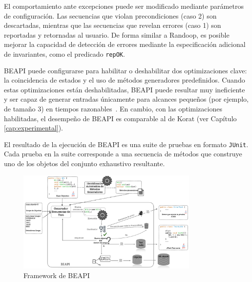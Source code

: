 El comportamiento ante excepciones puede ser modificado mediante parámetros de configuración. 
Las secuencias que violan precondiciones (caso 2) son descartadas, 
mientras que las secuencias que revelan errores (caso 1) 
son reportadas y retornadas al usuario. De forma similar a Randoop, 
es posible mejorar la capacidad de detección de errores mediante la especificación adicional de invariantes, 
como el predicado \texttt{repOK}.

BEAPI puede configurarse para habilitar o deshabilitar dos optimizaciones clave: 
la coincidencia de estados y el uso de métodos generadores predefinidos. 
Cuando estas optimizaciones están deshabilitadas, BEAPI puede resultar muy ineficiente 
y ser capaz de generar entradas únicamente para alcances pequeños (por ejemplo, de tamaño 3) en tiempos razonables~\cite{Politano20}. 
En cambio, con las optimizaciones habilitadas, el desempeño de BEAPI es comparable al de Korat (ver Capítulo \ref{cap:experimental}).

El resultado de la ejecución de BEAPI es una suite de pruebas en formato \texttt{JUnit}. 
Cada prueba en la suite corresponde a una secuencia de métodos que construye uno de los objetos del conjunto exhaustivo resultante.

\begin{figure}[H]
  \centering
  \includegraphics[width=0.8\textwidth]{images/beapi-arquitecture.jpeg}
  \caption{Framework de BEAPI}
  \label{fig:beapi-overview}
\end{figure}